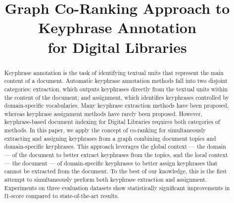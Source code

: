 \documentclass{llncs}
\title{Graph Co-Ranking Approach to Keyphrase Annotation\\for Digital Libraries}
\author{
}
\institute{
}
\begin{document}
  \maketitle

  \begin{abstract}
    Keyphrase annotation is the task of identifying textual units that represent the main content of a document.
    Automatic keyphrase annotation methods fall into two disjoint categories: extraction, which outputs keyphrases directly from the textual units within the content of the document; and assignment, which identifies keyphra\-ses controlled by domain-specific vocabularies.
    Many keyphrase extraction methods have been proposed, whereas keyphrase assignment methods have rarely been proposed. %
    However, keyphrase-based document indexing for Digital Libraries requires both categories of methods.
    In this paper, we apply the concept of co-ranking for simultaneously extracting and assigning keyphrases from a graph combining document topics and domain-specific keyphrases.
    This approach leverages the global context --- the domain --- of the document to better extract key\-phrases from the topics, and the local context --- the document --- of domain-specific keyphrases to better assign keyphrases that cannot be extracted from the document.
    To the best of our knowledge, this is the first attempt to simultaneously perform both keyphrase extraction and assignment.
    Experiments on three evaluation datasets show statistically significant improvements in f1-score compared to state-of-the-art results.


  \end{abstract}
\end{document}
